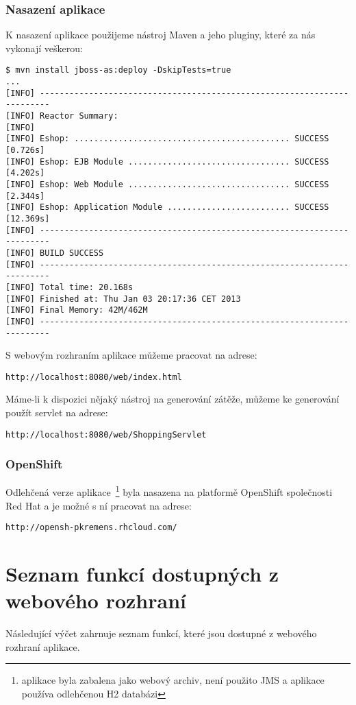 \documentclass[122pt,oneside]{fithesis}
\begin{document}
\subsection{Nasazení aplikace}
K nasazení aplikace použijeme nástroj Maven a jeho pluginy, které za nás vykonají veškerou:
\begin{lstlisting}
$ mvn install jboss-as:deploy -DskipTests=true
...
[INFO] ------------------------------------------------------------------------
[INFO] Reactor Summary:
[INFO] 
[INFO] Eshop: ............................................ SUCCESS [0.726s]
[INFO] Eshop: EJB Module ................................. SUCCESS [4.202s]
[INFO] Eshop: Web Module ................................. SUCCESS [2.344s]
[INFO] Eshop: Application Module ......................... SUCCESS [12.369s]
[INFO] ------------------------------------------------------------------------
[INFO] BUILD SUCCESS
[INFO] ------------------------------------------------------------------------
[INFO] Total time: 20.168s
[INFO] Finished at: Thu Jan 03 20:17:36 CET 2013
[INFO] Final Memory: 42M/462M
[INFO] ------------------------------------------------------------------------
\end{lstlisting}
S webovým rozhraním aplikace můžeme pracovat na adrese:
\begin{lstlisting}
http://localhost:8080/web/index.html
\end{lstlisting}
Máme-li k dispozici nějaký nástroj na generování zátěže, můžeme ke generování použít servlet na adrese:
\begin{lstlisting}
http://localhost:8080/web/ShoppingServlet
\end{lstlisting}

\subsection{OpenShift}
Odlehčená verze aplikace~\footnote{aplikace byla zabalena jako webový archiv, není použito JMS a aplikace používa odlehčenou H2 databázi} byla nasazena na platformě OpenShift společnosti Red Hat a je možné s ní pracovat na adrese:
\begin{lstlisting}
http://opensh-pkremens.rhcloud.com/
\end{lstlisting}

\chapter{Seznam funkcí dostupných z webového rozhraní}
Následující výčet zahrnuje seznam funkcí, které jsou dostupné z webového rozhraní aplikace.\\
\end{document}
